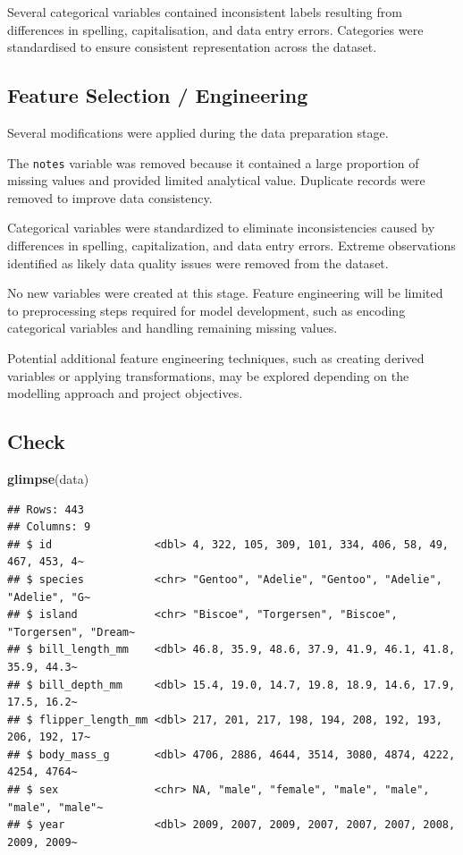 \documentclass[
]{article}
\newenvironment{Shaded}{\begin{snugshade}}{\end{snugshade}}
\newcommand{\FunctionTok}[1]{\textcolor[rgb]{0.13,0.29,0.53}{\textbf{#1}}}
\newcommand{\NormalTok}[1]{#1}
\begin{document}
Several categorical variables contained inconsistent labels resulting
from differences in spelling, capitalisation, and data entry errors.
Categories were standardised to ensure consistent representation across
the dataset.

\subsection{Feature Selection /
Engineering}\label{feature-selection-engineering}

Several modifications were applied during the data preparation stage.

The \texttt{notes} variable was removed because it contained a large
proportion of missing values and provided limited analytical value.
Duplicate records were removed to improve data consistency.

Categorical variables were standardized to eliminate inconsistencies
caused by differences in spelling, capitalization, and data entry
errors. Extreme observations identified as likely data quality issues
were removed from the dataset.

No new variables were created at this stage. Feature engineering will be
limited to preprocessing steps required for model development, such as
encoding categorical variables and handling remaining missing values.

Potential additional feature engineering techniques, such as creating
derived variables or applying transformations, may be explored depending
on the modelling approach and project objectives.

\subsection{Check}\label{check}

\begin{Shaded}
\begin{Highlighting}[]
\FunctionTok{glimpse}\NormalTok{(data)}
\end{Highlighting}
\end{Shaded}

\begin{verbatim}
## Rows: 443
## Columns: 9
## $ id                <dbl> 4, 322, 105, 309, 101, 334, 406, 58, 49, 467, 453, 4~
## $ species           <chr> "Gentoo", "Adelie", "Gentoo", "Adelie", "Adelie", "G~
## $ island            <chr> "Biscoe", "Torgersen", "Biscoe", "Torgersen", "Dream~
## $ bill_length_mm    <dbl> 46.8, 35.9, 48.6, 37.9, 41.9, 46.1, 41.8, 35.9, 44.3~
## $ bill_depth_mm     <dbl> 15.4, 19.0, 14.7, 19.8, 18.9, 14.6, 17.9, 17.5, 16.2~
## $ flipper_length_mm <dbl> 217, 201, 217, 198, 194, 208, 192, 193, 206, 192, 17~
## $ body_mass_g       <dbl> 4706, 2886, 4644, 3514, 3080, 4874, 4222, 4254, 4764~
## $ sex               <chr> NA, "male", "female", "male", "male", "male", "male"~
## $ year              <dbl> 2009, 2007, 2009, 2007, 2007, 2007, 2008, 2009, 2009~
\end{verbatim}
\end{document}
